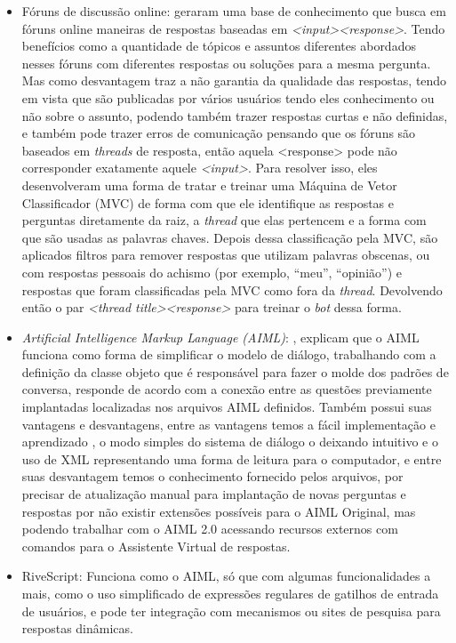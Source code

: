 \documentclass[
	12pt,				%
	oneside,
	a4paper,			%
	english,			%
	french,				%
	spanish,			%
	brazil				%
	]{abntex2}
\begin{document}
\begin{itemize}
	\item Fóruns de discussão online: \textcite{oline-foruns-database} geraram uma base de conhecimento que busca em fóruns online maneiras de respostas baseadas em \emph{<input><response>}. Tendo benefícios como a quantidade de tópicos e assuntos diferentes abordados nesses fóruns com diferentes respostas ou soluções para a mesma pergunta. Mas como desvantagem traz a não garantia da qualidade das respostas, tendo em vista que são publicadas por vários usuários tendo eles conhecimento ou não sobre o assunto, podendo também trazer respostas curtas e não definidas, e também pode trazer erros de comunicação pensando que os fóruns são baseados em \emph{threads} de resposta, então aquela <response> pode não corresponder exatamente aquele \emph{<input>}. Para resolver isso, eles desenvolveram uma forma de tratar e treinar uma Máquina de Vetor Classificador (MVC) de forma com que ele identifique as respostas e perguntas diretamente da raiz, a \emph{thread} que elas pertencem e a forma com que são usadas as palavras chaves. Depois dessa classificação pela MVC, são aplicados filtros para remover respostas que utilizam palavras obscenas, ou com respostas pessoais do achismo (por exemplo, “meu”, “opinião”) e respostas que foram classificadas pela MVC como fora da \emph{thread}. Devolvendo então o par \emph{<thread title><response>} para treinar o \emph{bot} dessa forma.

	\item \emph{Artificial Intelligence Markup Language (AIML)}: \textcite{AIML}, explicam que o AIML funciona como forma de simplificar o modelo de diálogo, trabalhando com a definição da classe objeto que é responsável para fazer o molde dos padrões de conversa, responde de acordo com a conexão entre as questões previamente implantadas localizadas nos arquivos AIML definidos. Também possui suas vantagens e desvantagens, entre as vantagens temos a fácil implementação e aprendizado , o modo simples do sistema de diálogo o deixando intuitivo e o uso de XML representando uma forma de leitura para o computador, e entre suas desvantagem temos o conhecimento fornecido pelos arquivos, por precisar de atualização manual para implantação de novas perguntas e respostas por não existir extensões possíveis para o AIML Original, mas podendo trabalhar com o AIML 2.0 acessando recursos externos com comandos para o Assistente Virtual de respostas.
	\item RiveScript: Funciona como o AIML, só que com algumas funcionalidades a mais, como o uso simplificado de expressões regulares de gatilhos de entrada de usuários, e pode ter integração com mecanismos ou sites de pesquisa para respostas dinâmicas.
\end{itemize} 
\end{document}
